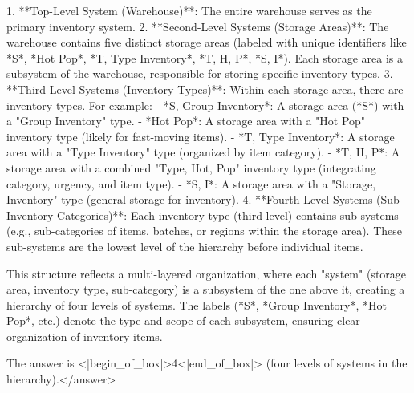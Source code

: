 1. **Top-Level System (Warehouse)**: The entire warehouse serves as the primary inventory system.  
2. **Second-Level Systems (Storage Areas)**: The warehouse contains five distinct storage areas (labeled with unique identifiers like *S*, *Hot Pop*, *T, Type Inventory*, *T, H, P*, *S, I*). Each storage area is a subsystem of the warehouse, responsible for storing specific inventory types.  
3. **Third-Level Systems (Inventory Types)**: Within each storage area, there are inventory types. For example:  
   - *S, Group Inventory*: A storage area (*S*) with a "Group Inventory" type.  
   - *Hot Pop*: A storage area with a "Hot Pop" inventory type (likely for fast-moving items).  
   - *T, Type Inventory*: A storage area with a "Type Inventory" type (organized by item category).  
   - *T, H, P*: A storage area with a combined "Type, Hot, Pop" inventory type (integrating category, urgency, and item type).  
   - *S, I*: A storage area with a "Storage, Inventory" type (general storage for inventory).  
4. **Fourth-Level Systems (Sub-Inventory Categories)**: Each inventory type (third level) contains sub-systems (e.g., sub-categories of items, batches, or regions within the storage area). These sub-systems are the lowest level of the hierarchy before individual items.    

This structure reflects a multi-layered organization, where each "system" (storage area, inventory type, sub-category) is a subsystem of the one above it, creating a hierarchy of four levels of systems. The labels (*S*, *Group Inventory*, *Hot Pop*, etc.) denote the type and scope of each subsystem, ensuring clear organization of inventory items.  

The answer is <|begin_of_box|>4<|end_of_box|> (four levels of systems in the hierarchy).</answer>